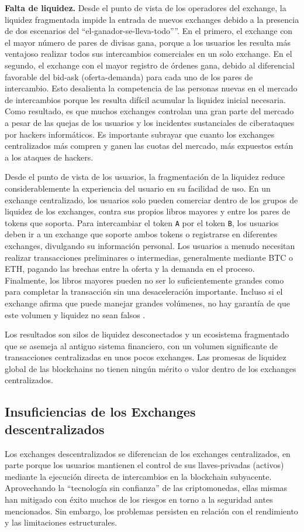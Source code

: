 \documentclass[UTF8,nofonts]{article}
\begin{document}
\begin{multicols}{2}
\textbf{Falta de liquidez.} Desde el punto de vista de los operadores del exchange, la liquidez fragmentada impide la entrada de nuevos exchanges debido a la presencia de dos escenarios del \enquote{el-ganador-se-lleva-todo”}. En el primero, el exchange con el mayor n\'umero de pares de divisas gana, porque a los usuarios les resulta m\'as ventajoso realizar todos sus intercambios comerciales en un solo exchange. En el segundo, el exchange con el mayor registro de \'ordenes gana, debido al diferencial favorable del bid-ask (oferta-demanda) para cada uno de los pares de intercambio. Esto desalienta la competencia de las personas nuevas en el mercado de intercambios porque les resulta dif\'icil acumular la liquidez inicial necesaria. Como resultado, es que muchos exchanges controlan una gran parte del mercado a pesar de las quejas de los usuarios y los incidentes sustanciales de ciberataques por hackers inform\'aticos. Es importante subrayar que cuanto los exchanges centralizados m\'as compren y ganen las cuotas del mercado, m\'as expuestos est\'an a los ataques de hackers.

Desde el punto de vista de los usuarios, la fragmentaci\'on de la liquidez reduce considerablemente la experiencia del usuario en su facilidad de uso. En un exchange centralizado, los usuarios solo pueden comerciar dentro de los grupos de liquidez de los exchanges, contra sus propios libros mayores y entre los pares de tokens que soporta. Para intercambiar el token \verb|A| por el token \verb|B|, los usuarios deben ir a un exchange que soporte ambos tokens o registrarse en diferentes exchanges, divulgando su informaci\'on personal. Los usuarios a menudo necesitan realizar transacciones preliminares o intermedias, generalmente mediante BTC o ETH, pagando las brechas entre la oferta y la demanda en el proceso. Finalmente, los libros mayores pueden no ser lo suficientemente grandes como para completar la transacci\'on sin una desaceleraci\'on importante. Incluso si el exchange afirma que puede manejar grandes vol\'umenes, no hay garant\'ia de que este volumen y liquidez no sean falsos \cite{fakevolume}.

Los resultados son silos de liquidez desconectados y un ecosistema fragmentado que se asemeja al antiguo sistema financiero, con un volumen significante de transacciones centralizadas en unos pocos exchanges. Las promesas de liquidez global de las blockchains no tienen ning\'un m\'erito o valor dentro de los exchanges centralizados.

\subsection{Insuficiencias de los Exchanges descentralizados}
Los exchanges descentralizados se diferencian de los exchanges centralizados, en parte porque los usuarios mantienen el control de sus llaves-privadas (activos) mediante la ejecuci\'on directa de intercambios en la blockchain subyacente. Aprovechando la \enquote{tecnolog\'ia sin confianza} de las criptomonedas, ellas mismas han mitigado con \'exito muchos de los riesgos en torno a la seguridad antes mencionados. Sin embargo, los problemas persisten en relaci\'on con el rendimiento y las limitaciones estructurales.


\end{multicols}
\end{document}
